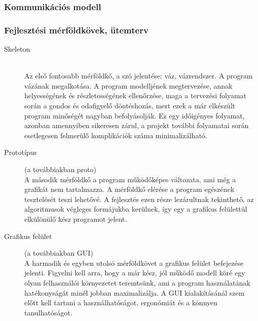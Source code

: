     \subsubsection{Kommunikációs modell}

    \subsubsection{Fejlesztési mérföldkövek, ütemterv}

	\begin{description}
		\item[Skeleton] \hfill \\
			Az első fontosabb mérföldkő, a szó jelentése: váz, vázrendszer. A program vázának megalkotása. A program modelljének megtervezése, annak helyességének és részletességének ellenőrzése, maga a tervezési folyamat során a gondos és odafigyelő döntéshozás, mert ezek a már elkészült program minőségét nagyban befolyásolják. Ez egy időigényes folyamat, azonban amennyiben sikeresen zárul, a projekt további folyamatai során esetlegesen felmerülő komplikációk száma minimalizálható.
		\item[Prototípus] (a továbbiakban proto)\hfill \\
			A második mérföldkő a program működőképes változata, ami még a grafikát nem tartalmazza. A mérföldkő elérése a program egészének tesztelését teszi lehetővé. A fejlesztés ezen része lezárultnak tekinthető, az algoritmusok végleges formájukba kerülnek, így egy a grafikus felülettül elkülönülő kész programot jelent.
		\item[Grafikus felület] (a továbbiakban GUI)\hfill \\
			A harmadik és egyben utolsó mérföldkövet a grafikus felület befejezése jelenti. Figyelni kell arra, hogy a már kész, jól működő modell köré egy olyan felhasználói környezetet teremtsünk, ami a program használatának hatékonyságát minél jobban maximalizálja. A GUI kialakításánál szem előtt kell tartani a használhatóságot, ergonómiát és a könnyen tanulhatóságot.
	\end{description}

